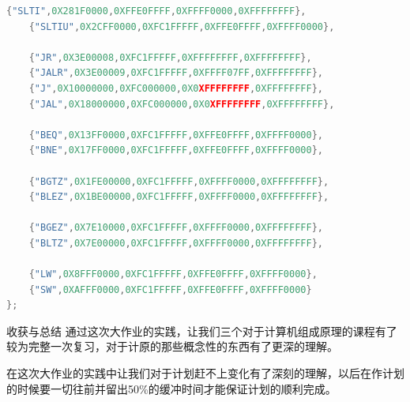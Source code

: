 \documentclass[UTF8,fntef,a4paper]{article}
\makeatletter
\renewcommand{\section}{\@startsection{section}{1}{0mm}
  {1.5\baselineskip}{0.5\baselineskip}{\bf\leftline}}
\makeatother
\begin{document}
\begin{CJK*}{UTF8}{kai}
\begin{lstlisting}[language={C++},keywordstyle=\color{blue!70},commentstyle=\color{red!50!green!50!blue!50},frame=shadowbox, rulesepcolor=\color{red!20!green!20!blue!20}]
    {"SLTI",0X281F0000,0XFFE0FFFF,0XFFFF0000,0XFFFFFFFF},
    {"SLTIU",0X2CFF0000,0XFC1FFFFF,0XFFE0FFFF,0XFFFF0000},

    {"JR",0X3E00008,0XFC1FFFFF,0XFFFFFFFF,0XFFFFFFFF},
    {"JALR",0X3E00009,0XFC1FFFFF,0XFFFF07FF,0XFFFFFFFF},
    {"J",0X10000000,0XFC000000,0X0XFFFFFFFF,0XFFFFFFFF},
    {"JAL",0X18000000,0XFC000000,0X0XFFFFFFFF,0XFFFFFFFF},

    {"BEQ",0X13FF0000,0XFC1FFFFF,0XFFE0FFFF,0XFFFF0000},
    {"BNE",0X17FF0000,0XFC1FFFFF,0XFFE0FFFF,0XFFFF0000},

    {"BGTZ",0X1FE00000,0XFC1FFFFF,0XFFFF0000,0XFFFFFFFF},
    {"BLEZ",0X1BE00000,0XFC1FFFFF,0XFFFF0000,0XFFFFFFFF},

    {"BGEZ",0X7E10000,0XFC1FFFFF,0XFFFF0000,0XFFFFFFFF},
    {"BLTZ",0X7E00000,0XFC1FFFFF,0XFFFF0000,0XFFFFFFFF},

    {"LW",0X8FFF0000,0XFC1FFFFF,0XFFE0FFFF,0XFFFF0000},
    {"SW",0XAFFF0000,0XFC1FFFFF,0XFFE0FFFF,0XFFFF0000}
};
\end{lstlisting}

\section{收获与总结}
	通过这次大作业的实践，让我们三个对于计算机组成原理的课程有了较为完整一次复习，对于计原的那些概念性的东西有了更深的理解。
	
	
	在这次大作业的实践中让我们对于计划赶不上变化有了深刻的理解，以后在作计划的时候要一切往前并留出50\%的缓冲时间才能保证计划的顺利完成。
\end{CJK*}
\end{document}
